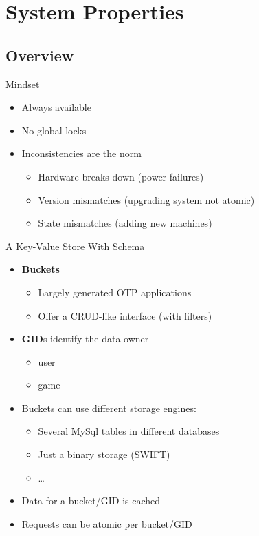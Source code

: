 \documentclass[aspectratio=169]{beamer}
\begin{document}
\section{System Properties}

\subsection{Overview}

\begin{frame}{Mindset}
    \begin{itemize}
        \item Always available
        \item No global locks
        \item Inconsistencies are the norm
            \begin{itemize}
                \item Hardware breaks down (power failures)
                \item Version mismatches (upgrading system not atomic)
                \item State mismatches (adding new machines)
            \end{itemize}
    \end{itemize}
\end{frame}

\begin{frame}{A Key-Value Store With Schema}
    \begin{itemize}
        \item \textbf{Buckets}
            \begin{itemize}
                \item Largely generated OTP applications
                \item Offer a CRUD-like interface (with filters)
            \end{itemize}
        \item \textbf{GID}s identify the data owner
            \begin{itemize}
                \item user
                \item game
            \end{itemize}
        \item Buckets can use different storage engines:
            \begin{itemize}
                \item Several MySql tables in different databases
                \item Just a binary storage (SWIFT)
                \item \dots
            \end{itemize}
        \item Data for a bucket/GID is cached
        \item Requests can be atomic per bucket/GID
    \end{itemize}
\end{frame}
\end{document}
